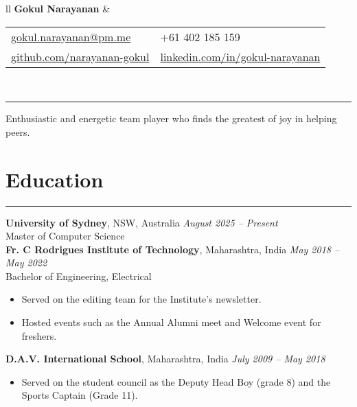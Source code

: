 \documentclass[11pt]{article}
\begin{document}
\begin{tabularx}{\textwidth}{ll}
	{\LARGE \textbf{Gokul Narayanan}} &
	\begin{tabular}{@{}ll}
		\href{mailto:gokul.narayanan@pm.me}{gokul.narayanan@pm.me}
		& +61 402 185 159 \\
		\href{https://github.com/narayanan-gokul}
		{github.com/narayanan-gokul} &
		\href{https://www.linkedin.com/in/gokul-narayanan-5a7681210/}
		{linkedin.com/in/gokul-narayanan} \\
	\end{tabular} \\
\end{tabularx}

\vspace{0.5em}
\rule{\textwidth}{2pt}

Enthusiastic and energetic team player who finds the greatest of joy in
helping peers.

\vspace{-0.5\baselineskip}
\section*{Education}
\hrule

\textbf{University of Sydney}, NSW, Australia \hfill
\textit{August 2025 -- Present} \\
Master of Computer Science \\

\vspace{-1\baselineskip}
\textbf{Fr. C Rodrigues Institute of Technology}, Maharashtra, India
\hfill \textit{May 2018 -- May 2022} \\
Bachelor of Engineering, Electrical \\
\vspace{-1.5\baselineskip}
\begin{itemize}[topsep=0pt, itemsep=0pt, partopsep=0pt, label=--]
	\item Served on the editing team for the Institute's newsletter.
	\item Hosted events such as the Annual Alumni meet and Welcome event
		for freshers.
\end{itemize}

\textbf{D.A.V. International School}, Maharashtra, India
\hfill \textit{July 2009 -- May 2018} \\
\vspace{-1.5\baselineskip}
\begin{itemize}[topsep=0pt, itemsep=0pt, partopsep=0pt, label=--]
	\item Served on the student council as the Deputy Head Boy (grade 8)
		and the Sports Captain (Grade 11).
\end{itemize}
\end{document}
